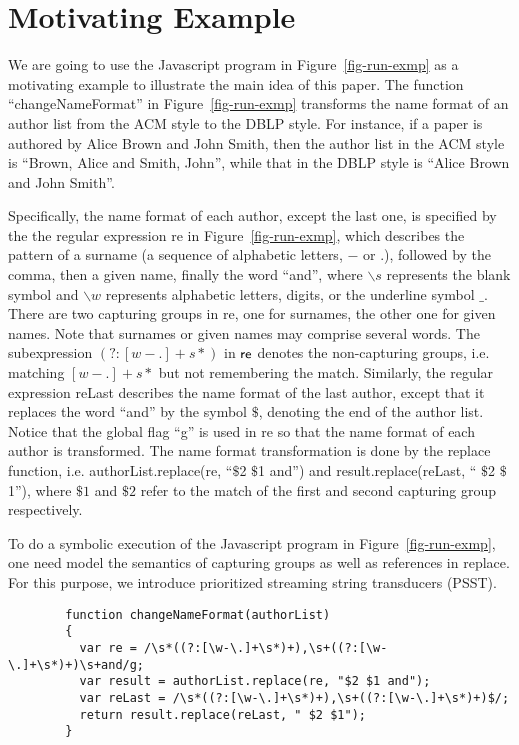 
\section{Motivating Example}\label{sec:mot}

We are going to use the Javascript program in Figure~\ref{fig-run-exmp} as a motivating example to illustrate the main idea of this paper. 
The function ``changeNameFormat''  in Figure~\ref{fig-run-exmp} transforms the name format of an author list from the ACM style to the DBLP style. For instance,  if a paper is authored by Alice Brown and John Smith, then the author list in the ACM style is ``Brown, Alice and Smith, John'', while that in the DBLP style is ``Alice Brown and John Smith''. 

Specifically,  the name format of each author, except the last one, is specified by the the regular expression {\sf re}  in Figure~\ref{fig-run-exmp}, which describes the pattern of a surname (a sequence of alphabetic letters, $-$ or $.$), followed by the comma, then a given name, finally the word ``and'', where $\backslash s$ represents the blank symbol and $\backslash w$ represents alphabetic letters, digits, or the underline symbol $\_$. There are two capturing groups in {\sf re}, one for surnames, the other one for given names. Note that surnames or given names may comprise several words. The subexpression $(?: [w-.]+s*)$ in ${\sf re}$ denotes the non-capturing groups, i.e. matching $[w-.]+s*$ but not remembering the match.
Similarly, the regular expression {\sf reLast} describes the name format of the last author, except that it replaces the word ``and'' by the symbol $\$$, denoting the end of the author list. Notice that the global flag ``g'' is used in {\sf re} so that the name format of each author is transformed. The name format transformation is done by the {\sf replace} function, i.e. {\sf authorList.replace(re, ``$\$$2 $\$$1 and'')} and  {\sf result.replace(reLast, `` $\$$2 $\$$1'')}, where $\$1$ and $\$2$ refer to the match of the first and second capturing group respectively. 

To do a symbolic execution of the Javascript program in Figure~\ref{fig-run-exmp}, one need model the semantics of capturing groups as well as references in {\sf replace}. For this purpose, we introduce prioritized streaming string transducers (PSST). 

\begin{figure*}[htbp]
\begin{center}
{
\begin{verbatim}
		function changeNameFormat(authorList)
		{
		  var re = /\s*((?:[\w-\.]+\s*)+),\s+((?:[\w-\.]+\s*)+)\s+and/g;
		  var result = authorList.replace(re, "$2 $1 and");
		  var reLast = /\s*((?:[\w-\.]+\s*)+),\s+((?:[\w-\.]+\s*)+)$/;
		  return result.replace(reLast, " $2 $1");
		}
\end{verbatim}
}
\end{center}
\caption{Change the name format of an author list: A motivating example}
\label{fig-run-exmp}
\end{figure*}
